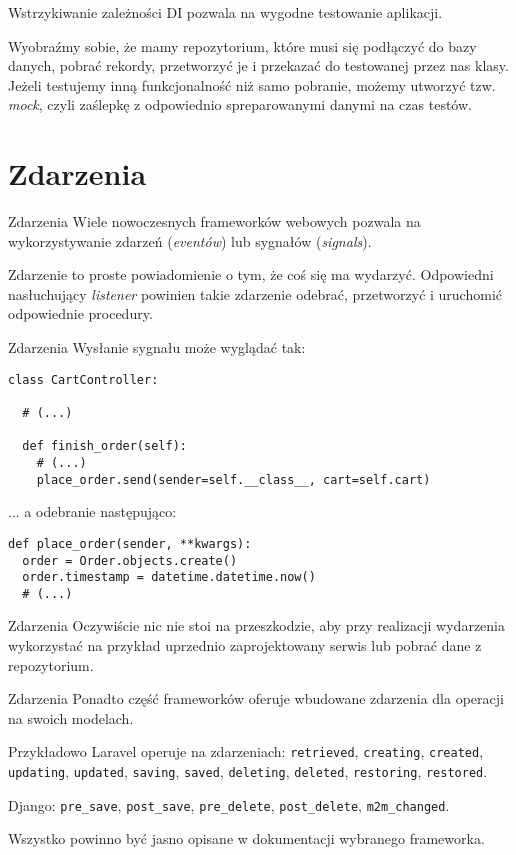\begin{frame}{Wstrzykiwanie zależności}
	DI pozwala na wygodne testowanie aplikacji.
	
	Wyobraźmy sobie, że mamy repozytorium, które musi się podłączyć do bazy danych, pobrać rekordy, przetworzyć je i przekazać do testowanej przez nas klasy. Jeżeli testujemy inną funkcjonalność niż samo pobranie, możemy utworzyć tzw. \emph{mock}, czyli zaślepkę z odpowiednio spreparowanymi danymi na czas testów.
\end{frame}

\section{Zdarzenia}

\begin{frame}{Zdarzenia}
	Wiele nowoczesnych frameworków webowych pozwala na wykorzystywanie zdarzeń (\emph{eventów}) lub sygnałów (\emph{signals}). 
	
	Zdarzenie to proste powiadomienie o tym, że coś się ma wydarzyć. Odpowiedni nasłuchujący \emph{listener} powinien takie zdarzenie odebrać, przetworzyć i uruchomić odpowiednie procedury.
\end{frame}

\begin{frame}[fragile]{Zdarzenia}
	Wysłanie sygnału może wyglądać tak:

	\begin{lstlisting}
class CartController:

  # (...)
  
  def finish_order(self):
    # (...)
    place_order.send(sender=self.__class__, cart=self.cart)
	\end{lstlisting}
	
	... a odebranie następująco:
	
	\begin{lstlisting}
def place_order(sender, **kwargs):
  order = Order.objects.create()
  order.timestamp = datetime.datetime.now()
  # (...)
	\end{lstlisting}
\end{frame}

\begin{frame}{Zdarzenia}
	Oczywiście nic nie stoi na przeszkodzie, aby przy realizacji wydarzenia wykorzystać na przykład uprzednio zaprojektowany serwis lub pobrać dane z repozytorium.
\end{frame}

\begin{frame}{Zdarzenia}
	Ponadto część frameworków oferuje wbudowane zdarzenia dla operacji na swoich modelach.
	
	Przykładowo Laravel operuje na zdarzeniach: \texttt{retrieved}, \texttt{creating}, \texttt{created}, \texttt{updating}, \texttt{updated}, \texttt{saving}, \texttt{saved}, \texttt{deleting}, \texttt{deleted}, \texttt{restoring}, \texttt{restored}.
	
	Django: \texttt{pre\_save}, \texttt{post\_save}, \texttt{pre\_delete}, \texttt{post\_delete}, \texttt{m2m\_changed}.
	
	Wszystko powinno być jasno opisane w dokumentacji wybranego frameworka.
\end{frame}

